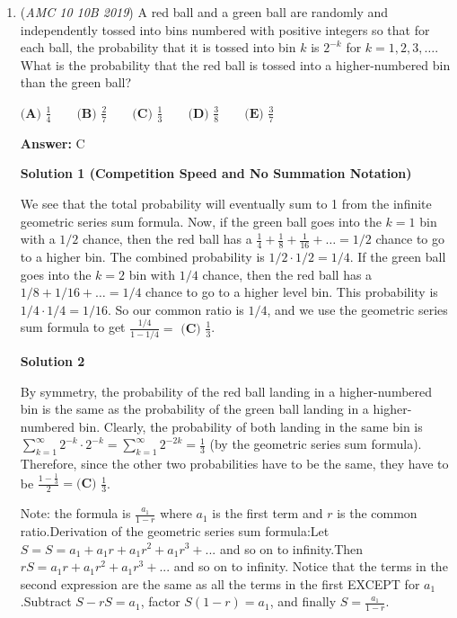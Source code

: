 \begin{enumerate}
 


	\item (\textit{AMC 10 10B 2019}) A red ball and a green ball are randomly and independently tossed into bins numbered with positive integers so that for each ball, the probability that it is tossed into bin $k$ is $2^{-k}$ for $k=1,2,3,\ldots.$ What is the probability that the red ball is tossed into a higher-numbered bin than the green ball?


 $\textbf{(A) } \frac{1}{4} \qquad\textbf{(B) } \frac{2}{7} \qquad\textbf{(C) } \frac{1}{3} \qquad\textbf{(D) } \frac{3}{8} \qquad\textbf{(E) } \frac{3}{7}$

 \textbf{Answer: }C



\textbf{Solution 1 (Competition Speed and No Summation Notation)}

We see that the total probability will eventually sum to 1 from the infinite geometric series sum formula. Now, if the green ball goes into the \( k=1 \) bin with a \( 1/2 \) chance, then the red ball has a \( \frac{1}{4} + \frac{1}{8} + \frac{1}{16} + \dots = 1/2 \) chance to go to a higher bin. The combined probability is \( 1/2 \cdot 1/2 = 1/4 \). If the green ball goes into the \( k=2 \) bin with \( 1/4 \) chance, then the red ball has a \( 1/8 + 1/16 + \dots = 1/4 \) chance to go to a higher level bin. This probability is \( 1/4 \cdot 1/4 = 1/16 \). So our common ratio is \( 1/4 \), and we use the geometric series sum formula to get \( \frac{1/4}{1 - 1/4} = \) $\boxed{\textbf{(C) } \frac{1}{3}}$.

 



\textbf{Solution 2}

By symmetry, the probability of the red ball landing in a higher-numbered bin is the same as the probability of the green ball landing in a higher-numbered bin. Clearly, the probability of both landing in the same bin is $\sum_{k=1}^{\infty}{2^{-k} \cdot 2^{-k}} = \sum_{k=1}^{\infty}2^{-2k} = \frac{1}{3}$ (by the geometric series sum formula). Therefore, since the other two probabilities have to be the same, they have to be $\frac{1-\frac{1}{3}}{2} = \boxed{\textbf{(C) } \frac{1}{3}}$.

 
Note: the formula is $\frac{a_{1}}{1-r}$ where $a_{1}$ is the first term and $r$ is the common ratio.Derivation of the geometric series sum formula:Let $S = S=a_{1}+a_{1}r+a_{1}r^{2}+a_{1}r^{3}+...$ and so on to infinity.Then $rS=a_{1}r+a_{1}r^{2}+a_{1}r^{3}+...$ and so on to infinity. Notice that the terms in the second expression are the same as all the terms in the first EXCEPT for $a_{1}$.Subtract $S-rS=a_{1}$, factor $S\left(1-r\right)=a_{1}$, and finally $S=\frac{a_{1}}{1-r}$.


\end{enumerate}
